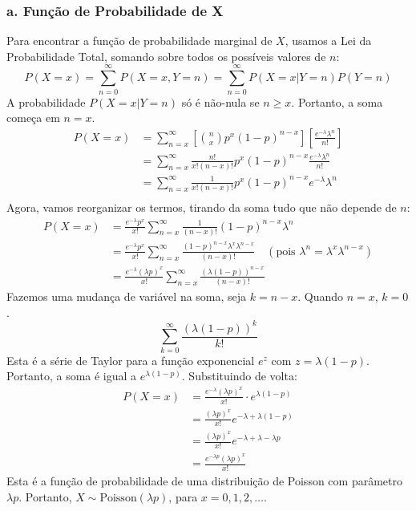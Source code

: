 \documentclass[12pt]{article}
\begin{document}
\subsubsection*{a. Função de Probabilidade de X}
Para encontrar a função de probabilidade marginal de $X$, usamos a Lei da Probabilidade Total, somando sobre todos os possíveis valores de $n$:
\[ P(X=x) = \sum_{n=0}^{\infty} P(X=x, Y=n) = \sum_{n=0}^{\infty} P(X=x | Y=n) P(Y=n) \]
A probabilidade $P(X=x|Y=n)$ só é não-nula se $n \ge x$. Portanto, a soma começa em $n=x$.
\begin{align*}
P(X=x) &= \sum_{n=x}^{\infty} \left[ \binom{n}{x} p^x (1-p)^{n-x} \right] \left[ \frac{e^{-\lambda}\lambda^n}{n!} \right] \\
&= \sum_{n=x}^{\infty} \frac{n!}{x!(n-x)!} p^x (1-p)^{n-x} \frac{e^{-\lambda}\lambda^n}{n!} \\
&= \sum_{n=x}^{\infty} \frac{1}{x!(n-x)!} p^x (1-p)^{n-x} e^{-\lambda}\lambda^n \\
\end{align*}
Agora, vamos reorganizar os termos, tirando da soma tudo que não depende de $n$:
\begin{align*}
P(X=x) &= \frac{e^{-\lambda} p^x}{x!} \sum_{n=x}^{\infty} \frac{1}{(n-x)!} (1-p)^{n-x} \lambda^n \\
&= \frac{e^{-\lambda} p^x}{x!} \sum_{n=x}^{\infty} \frac{(1-p)^{n-x} \lambda^x \lambda^{n-x}}{(n-x)!} \quad (\text{pois } \lambda^n = \lambda^x \lambda^{n-x}) \\
&= \frac{e^{-\lambda} (\lambda p)^x}{x!} \sum_{n=x}^{\infty} \frac{(\lambda(1-p))^{n-x}}{(n-x)!}
\end{align*}
Fazemos uma mudança de variável na soma, seja $k = n-x$. Quando $n=x$, $k=0$.
\[ \sum_{k=0}^{\infty} \frac{(\lambda(1-p))^{k}}{k!} \]
Esta é a série de Taylor para a função exponencial $e^z$ com $z = \lambda(1-p)$. Portanto, a soma é igual a $e^{\lambda(1-p)}$.
Substituindo de volta:
\begin{align*}
P(X=x) &= \frac{e^{-\lambda} (\lambda p)^x}{x!} \cdot e^{\lambda(1-p)} \\
&= \frac{(\lambda p)^x}{x!} e^{-\lambda + \lambda(1-p)} \\
&= \frac{(\lambda p)^x}{x!} e^{-\lambda + \lambda - \lambda p} \\
&= \frac{e^{-\lambda p} (\lambda p)^x}{x!}
\end{align*}
Esta é a função de probabilidade de uma distribuição de Poisson com parâmetro $\lambda p$.
Portanto, $X \sim \text{Poisson}(\lambda p)$, para $x=0, 1, 2, \dots$.
\end{document}
